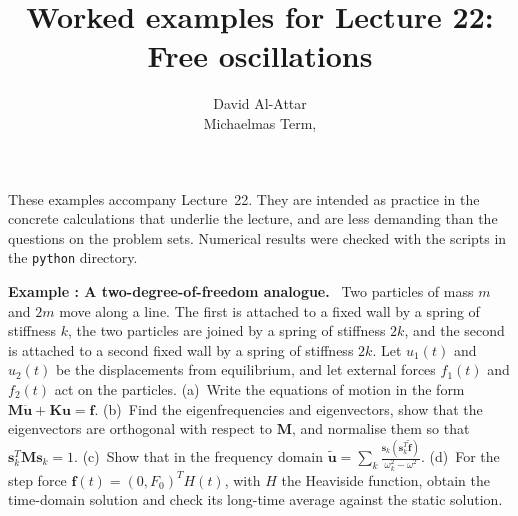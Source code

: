 \documentclass[a4paper,12pt]{paper}
\title{Worked examples for Lecture 22: Free oscillations}
\author{David Al-Attar \\ Michaelmas Term, \the\year}
\newcounter{example}
\renewenvironment{example}[1]{%
  \refstepcounter{example}%
  \begin{mdframed}[linewidth=1pt,innertopmargin=6pt,innerbottommargin=6pt]%
  \noindent\textbf{Example \theexample: #1.}\ }{%
  \end{mdframed}}
\begin{document}
\maketitle

\noindent These examples accompany Lecture~22. They are intended as practice in the concrete
calculations that underlie the lecture, and are less demanding than the questions on the
problem sets. Numerical results were checked with the scripts in the \texttt{python}
directory.

\begin{example}{A two-degree-of-freedom analogue}
Two particles of mass $m$ and $2m$ move along a line. The first is attached to a fixed wall
by a spring of stiffness $k$, the two particles are joined by a spring of stiffness $2k$, and
the second is attached to a second fixed wall by a spring of stiffness $2k$. Let $u_{1}(t)$
and $u_{2}(t)$ be the displacements from equilibrium, and let external forces $f_{1}(t)$ and
$f_{2}(t)$ act on the particles. (a)~Write the equations of motion in the form
$\mathbf{M}\ddot{\mathbf{u}}+\mathbf{K}\mathbf{u}=\mathbf{f}$. (b)~Find the eigenfrequencies
and eigenvectors, show that the eigenvectors are orthogonal with respect to $\mathbf{M}$, and
normalise them so that $\mathbf{s}_{k}^{T}\mathbf{M}\mathbf{s}_{k}=1$. (c)~Show that in the
frequency domain
$\tilde{\mathbf{u}}=\sum_{k}\frac{\mathbf{s}_{k}(\mathbf{s}_{k}^{T}\tilde{\mathbf{f}})}{\omega_{k}^{2}-\omega^{2}}$.
(d)~For the step force $\mathbf{f}(t)=(0,F_{0})^{T}H(t)$, with $H$ the Heaviside function,
obtain the time-domain solution and check its long-time average against the static solution.
\end{example}
\end{document}
